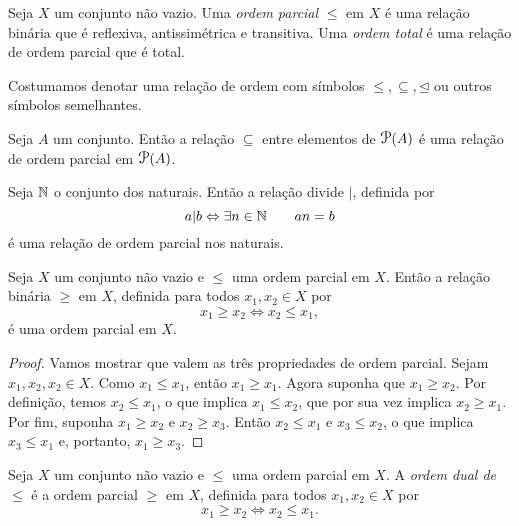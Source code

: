 \begin{defi}
	Seja $X$ um conjunto não vazio. Uma \emph{ordem parcial} $\leq$ em $X$ é uma relação binária que é reflexiva, antissimétrica e transitiva. Uma \emph{ordem total} é uma relação de ordem parcial que é total.
\end{defi}

	Costumamos denotar uma relação de ordem com símbolos $\leq, \subseteq, \unlhd$ ou outros símbolos semelhantes.
	
\begin{ex}
	Seja $A$ um conjunto. Então a relação $\subseteq$ entre elementos de $\p(A)$ é uma relação de ordem parcial em $\p(A)$.
\end{ex}

\begin{ex}
	Seja $\mathbb{N}$ o conjunto dos naturais. Então a relação divide $|$, definida por
	\begin{equation*}
	a|b \Leftrightarrow \exists n \in \mathbb{N} \qquad an=b
	\end{equation*}
é uma relação de ordem parcial nos naturais.
\end{ex}

\begin{prop}
	Seja $X$ um conjunto não vazio e $\leq$ uma ordem parcial em $X$. Então a relação binária $\geq$ em $X$, definida para todos $x_1,x_2 \in X$ por
	\begin{equation*}
	x_1 \geq x_2 \Leftrightarrow x_2 \leq x_1,
	\end{equation*}
é uma ordem parcial em $X$.
\end{prop}
\begin{proof}
	Vamos mostrar que valem as três propriedades de ordem parcial. Sejam $x_1,x_2,x_2 \in X$. Como $x_1 \leq x_1$, então $x_1 \geq x_1$. Agora suponha que $x_1 \geq x_2$. Por definição, temos $x_2 \leq x_1$, o que implica $x_1 \leq x_2$, que por sua vez implica $x_2 \geq x_1$. Por fim, suponha $x_1 \geq x_2$ e $x_2 \geq x_3$. Então $x_2 \leq x_1$ e $x_3 \leq x_2$, o que implica $x_3 \leq x_1$ e, portanto, $x_1 \geq x_3$.
\end{proof}

\begin{defi}
	Seja $X$ um conjunto não vazio e $\leq$ uma ordem parcial em $X$. A \emph{ordem dual de $\leq$} é a ordem parcial $\geq$ em $X$, definida para todos $x_1,x_2 \in X$ por
	\begin{equation*}
	x_1 \geq x_2 \Leftrightarrow x_2 \leq x_1.
	\end{equation*}
\end{defi}

